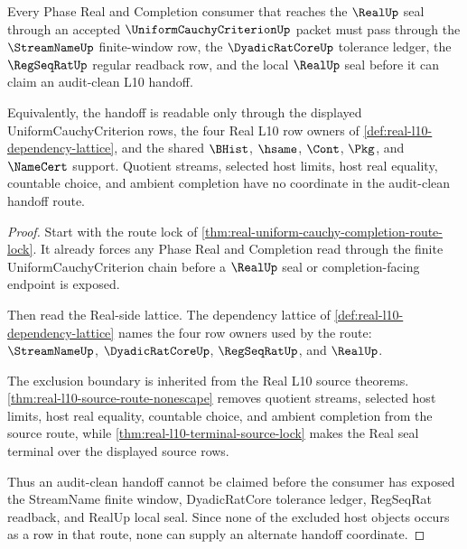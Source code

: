 \begin{theorem}
\label{thm:real-regseqrat-streamname-auditclean-handoff}
Every Phase Real and Completion consumer that reaches the $\RealUp$ seal
through an accepted $\UniformCauchyCriterionUp$ packet must pass through the
$\StreamNameUp$ finite-window row, the $\DyadicRatCoreUp$ tolerance ledger, the
$\RegSeqRatUp$ regular readback row, and the local $\RealUp$ seal before it can
claim an audit-clean L10 handoff.

Equivalently, the handoff is readable only through the displayed
UniformCauchyCriterion rows, the four Real L10 row owners of
\autoref{def:real-l10-dependency-lattice}, and the shared $\BHist$, $\hsame$,
$\Cont$, $\Pkg$, and $\NameCert$ support. Quotient streams, selected host
limits, host real equality, countable choice, and ambient completion have no
coordinate in the audit-clean handoff route.
\end{theorem}
\begin{proof}
Start with the route lock of
\autoref{thm:real-uniform-cauchy-completion-route-lock}. It already forces any
Phase Real and Completion read through the finite UniformCauchyCriterion chain
before a $\RealUp$ seal or completion-facing endpoint is exposed.

Then read the Real-side lattice. The dependency lattice of
\autoref{def:real-l10-dependency-lattice} names the four row owners used by
the route: $\StreamNameUp$, $\DyadicRatCoreUp$, $\RegSeqRatUp$, and $\RealUp$.

The exclusion boundary is inherited from the Real L10 source theorems.
\autoref{thm:real-l10-source-route-nonescape} removes quotient streams,
selected host limits, host real equality, countable choice, and ambient
completion from the source route, while
\autoref{thm:real-l10-terminal-source-lock} makes the Real seal terminal over
the displayed source rows.

Thus an audit-clean handoff cannot be claimed before the consumer has exposed
the StreamName finite window, DyadicRatCore tolerance ledger, RegSeqRat
readback, and RealUp local seal. Since none of the excluded host objects occurs
as a row in that route, none can supply an alternate handoff coordinate.
\end{proof}

